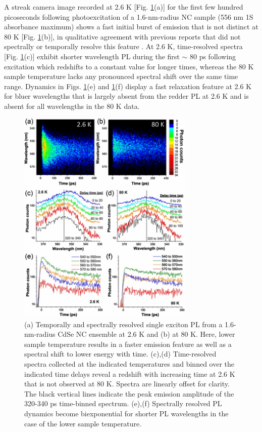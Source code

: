 A streak camera image recorded at 2.6 K [Fig. \ref{f:trpl1}(a)]  for the first few hundred picoseconds following photoexcitation of a 1.6-nm-radius NC sample (556 nm 1S absorbance maximum) shows a fast initial burst of emission that is not distinct at 80 K [Fig. \ref{f:trpl1}(b)], in qualitative agreement with previous reports that did not spectrally or temporally resolve this feature \cite{:/content/aip/journal/apl/82/17/10.1063/1.1570923, doi:10.1021/jp051738b, PhysRevB.74.085320, PhysRevLett.102.177402}.  At 2.6 K, time-resolved spectra [Fig. \ref{f:trpl1}(c)] exhibit shorter wavelength PL during the first $\sim$ 80 ps following excitation which redshifts to a constant value for longer times, whereas the 80 K sample temperature lacks any pronounced spectral shift over the same time range. Dynamics in Figs. \ref{f:trpl1}(e) and \ref{f:trpl1}(f) display a fast relaxation feature at 2.6 K for bluer wavelengths that is largely absent from the redder PL at 2.6 K and is absent for all wavelengths in the 80 K data. \par

\begin{figure}
\begin{center}
\includegraphics[width=0.75\textwidth]{./Chapter4/trpl1.png}
\caption[Spectra and dynamics of PL at 3K and 80K from an ensemble of CdSe NCs.]{(a) Temporally and spectrally resolved single exciton PL from a 1.6-nm-radius CdSe NC ensemble at 2.6 K and (b) at 80 K. Here, lower sample temperature results in a faster emission feature as well as a spectral shift to lower energy with time. (c),(d) Time-resolved spectra collected at the indicated temperatures and binned over the indicated time delays reveal a redshift with increasing time at 2.6 K that is not observed at 80 K. Spectra are linearly offset for clarity. The black vertical lines indicate the peak emission amplitude of the 320-340 ps time-binned spectrum. (e),(f) Spectrally resolved PL dynamics become biexponential for shorter PL wavelengths in the case of the lower sample temperature.}
\label{f:trpl1}
\end{center}
\end{figure}

